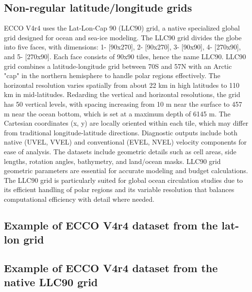 \subsection*{Non-regular latitude/longitude grids}
\par ECCO V4r4 uses the Lat-Lon-Cap 90 (LLC90) grid, a native specialized global grid designed for ocean and sea-ice modeling. The LLC90 grid divides the globe into five faces, with dimensions: 1- [90x270], 2- [90x270], 3- [90x90], 4- [270x90], and 5- [270x90]. Each face consists of 90x90 tiles, hence the name LLC90. LLC90 grid combines a latitude-longitude grid between 70\textdegree S and 57\textdegree N with an Arctic "cap" in the northern hemisphere to handle polar regions effectively. The horizontal resolution varies spatially from about 22 km in high latitudes to 110 km in mid-latitudes. Redarding the vertical and horizontal resolutions, the grid has 50 vertical levels, with spacing increasing from 10 m near the surface to 457 m near the ocean bottom, which is set at a maximum depth of 6145 m. The Cartesian coordinates (x, y) are locally oriented within each tile, which may differ from traditional longitude-latitude directions. Diagnostic outputs include both native (UVEL, VVEL) and conventional (EVEL, NVEL) velocity components for ease of analysis. The datasets include geometric details such as cell areas, side lengths, rotation angles, bathymetry, and land/ocean masks. LLC90 grid geometric parameters are essential for accurate modeling and budget calculations. The LLC90 grid is particularly suited for global ocean circulation studies due to its efficient handling of polar regions and its variable resolution that balances computational efficiency with detail where needed.

\pagebreak
\subsection{Example of ECCO V4r4 dataset from the lat-lon grid}

\pagebreak
\subsection{Example of ECCO V4r4 dataset from the native LLC90 grid}

\pagebreak
